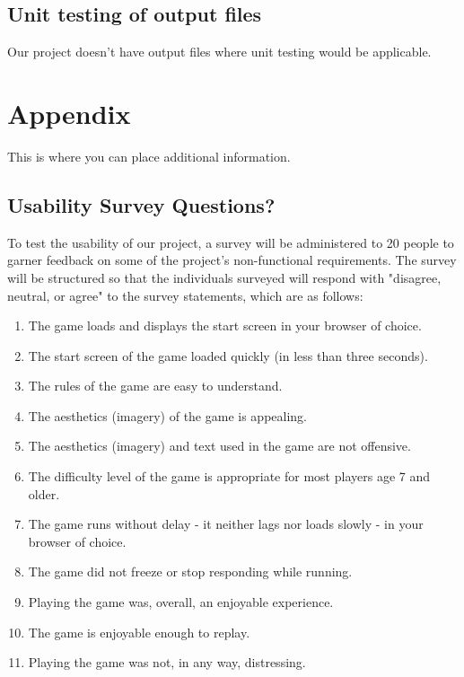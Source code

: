 \documentclass[12pt, titlepage]{article}
\begin{document}
\subsection{Unit testing of output files}
Our project doesn't have output files where unit testing would be applicable. 

%

%

\newpage

\section{Appendix}

This is where you can place additional information.



\subsection{Usability Survey Questions?}

To test the usability of our project, a survey will be administered to 20 people to garner feedback on some of the project's non-functional requirements. The survey will be structured so that the individuals surveyed will respond with "disagree, neutral, or agree" to the survey statements, which are as follows: 

\begin{enumerate}
    \item The game loads and displays the start screen in your browser of choice. 
    \item The start screen of the game loaded quickly (in less than three seconds). 
    \item The rules of the game are easy to understand. 
    \item The aesthetics (imagery) of the game is appealing.
    \item The aesthetics (imagery) and text used in the game are not offensive.
    \item The difficulty level of the game is appropriate for most players age 7 and older. 
    \item The game runs without delay - it neither lags nor loads slowly - in your browser of choice.  
    \item The game did not freeze or stop responding while running.
    \item Playing the game was, overall, an enjoyable experience. 
    \item The game is enjoyable enough to replay. 
    \item Playing the game was not, in any way, distressing. 
\end{enumerate}
\end{document}
